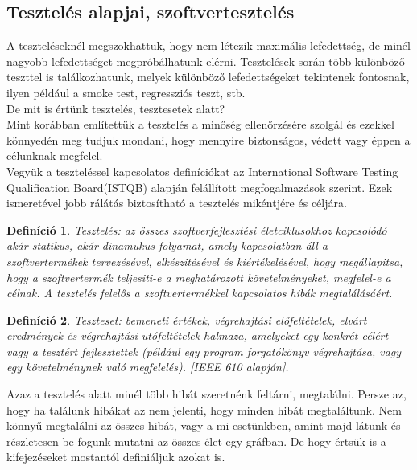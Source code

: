 \documentclass[12pt]{article}
\newtheorem{defin}{Definíció}[section]
\begin{document}
\subsection{Tesztelés alapjai, szoftvertesztelés}

A teszteléseknél megszokhattuk, hogy nem létezik maximális lefedettség, de minél nagyobb lefedettséget megpróbálhatunk elérni. Tesztelések során több különböző teszttel is találkozhatunk, melyek különböző lefedettségeket tekintenek fontosnak, ilyen például a smoke test, regressziós teszt, stb.\\

De mit is értünk tesztelés, tesztesetek alatt?\\
Mint korábban említettük a tesztelés a minőség ellenőrzésére szolgál és ezekkel könnyedén meg tudjuk mondani, hogy mennyire biztonságos, védett vagy éppen a célunknak megfelel.\\

Vegyük a teszteléssel kapcsolatos definíciókat az International Software Testing Qualification Board(ISTQB) alapján felállított megfogalmazások szerint. Ezek ismeretével jobb rálátás biztosítható a tesztelés mikéntjére és céljára.\\

\begin{defin}
Tesztelés: az összes szoftverfejlesztési életciklusokhoz kapcsolódó akár statikus, akár dinamukus folyamat, amely kapcsolatban áll a szoftvertermékek tervezésével, elkészitésével és kiértékelésével, hogy megállapitsa, hogy a szoftvertermék teljesiti-e a meghatározott követelményeket, megfelel-e a célnak. A tesztelés felelős a szoftvertermékkel kapcsolatos hibák megtalálásáért. ~\cite{htb:masterfield}
\end{defin}

\begin{defin}
Teszteset: bemeneti értékek, végrehajtási előfeltételek, elvárt eredmények és végrehajtási utófeltételek halmaza, amelyeket egy konkrét célért vagy a tesztért fejlesztettek (például egy program forgatókönyv végrehajtása, vagy egy követelménynek való megfelelés). [IEEE 610 alapján]. ~\cite{htb:masterfield}
\end{defin}

Azaz a tesztelés alatt minél több hibát szeretnénk feltárni, megtalálni. Persze az, hogy ha találunk hibákat az nem jelenti, hogy minden hibát megtaláltunk. Nem könnyű megtalálni az összes hibát, vagy a mi esetünkben, amint majd látunk és részletesen be fogunk mutatni az összes élet egy gráfban. De hogy értsük is a kifejezéseket mostantól definiáljuk azokat is.\\
\end{document}
